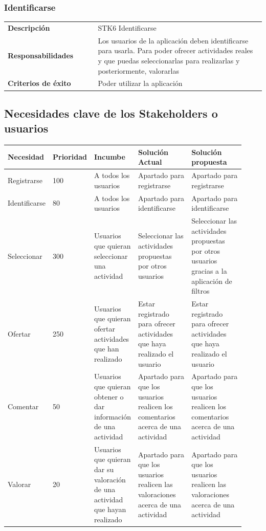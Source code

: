 \documentclass[11pt]{article}
\begin{document}
\subsubsection{Identificarse}
\begin{table}[H]
  \centering
  \begin{tabular}{p{0.35\linewidth}|p{0.65\linewidth}}
    \toprule
    \textbf{Descripción} & STK6 Identificarse\\
    \textbf{Responsabilidades} & Los usuarios de la aplicación deben identificarse para usarla. Para poder ofrecer actividades reales y que puedas seleccionarlas para realizarlas y posteriormente, valorarlas\\
    \textbf{Criterios de éxito} & Poder utilizar la aplicación \\
    \bottomrule
  \end{tabular}
\end{table}

\subsection{Necesidades clave de los Stakeholders o usuarios}
          
\begin{table}[H]
  \centering
  \begin{tabular}{p{0.15\linewidth}p{0.12\linewidth}p{0.15\linewidth}p{0.25\linewidth}p{0.25\linewidth}}
    \toprule
    \textbf{Necesidad} & \textbf{Prioridad} & \textbf{Incumbe} & \textbf{Solución Actual} & \textbf{Solución propuesta} \\
    \midrule
    Registrarse & 100 & A todos los usuarios & Apartado para registrarse & Apartado para registrarse\\
    Identificarse & 80 & A todos los usuarios & Apartado para identificarse & Apartado para identificarse\\
    Seleccionar & 300 & Usuarios que quieran seleccionar una actividad & Seleccionar las actividades propuestas por otros usuarios & Seleccionar las actividades propuestas por otros usuarios gracias a la aplicación de filtros\\
    Ofertar & 250 & Usuarios que quieran ofertar actividades que han realizado & Estar registrado para ofrecer actividades que haya realizado el usuario & Estar registrado para ofrecer actividades que haya realizado el usuario\\
    Comentar & 50 & Usuarios que quieran obtener o dar información de una actividad & Apartado para que los usuarios realicen los comentarios acerca de una actividad & Apartado para que los usuarios realicen los comentarios acerca de una actividad\\
    Valorar & 20 & Usuarios que quieran dar su valoración de una actividad que hayan realizado & Apartado para que los usuarios realicen las valoraciones acerca de una actividad & Apartado para que los usuarios realicen las valoraciones acerca de una actividad \\
    
    \bottomrule
  \end{tabular}
\end{table}
\newpage
\end{document}

